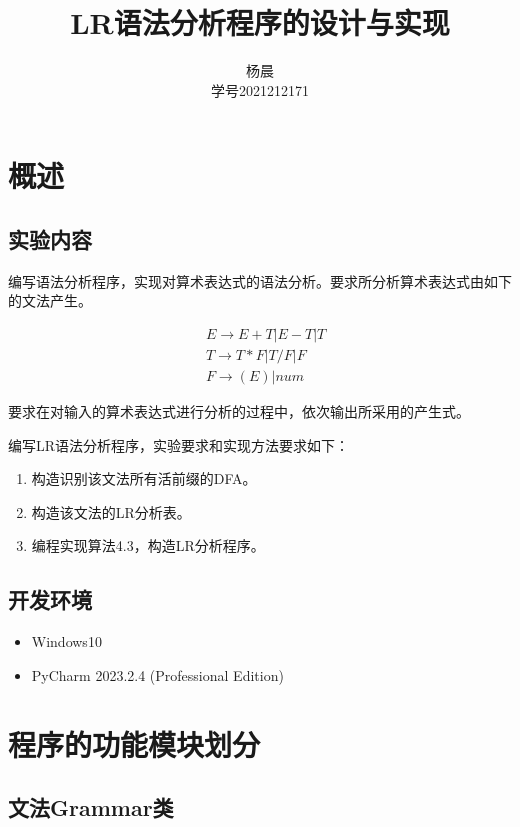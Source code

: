 \documentclass[lang=cn,11pt,a4paper]{elegantpaper}
\title{LR语法分析程序的设计与实现}
\author{杨晨 \\学号2021212171}
\institute{北京邮电大学 计算机学院}
\date{\zhtoday}
\begin{document}
\maketitle

\section{概述}

\subsection{实验内容}

编写语法分析程序，实现对算术表达式的语法分析。要求所分析算术表达式由如下的文法产生。

\label{grammar}
$$
\begin{aligned}
& E\rightarrow E+T | E-T | T \\
& T\rightarrow T*F | T/F | F \\
& F\rightarrow (E) | num
\end{aligned}
$$

要求在对输入的算术表达式进行分析的过程中，依次输出所采用的产生式。

编写LR语法分析程序，实验要求和实现方法要求如下：

\begin{enumerate}
    \item 构造识别该文法所有活前缀的DFA。
    \item 构造该文法的LR分析表。
    \item 编程实现算法4.3，构造LR分析程序。
\end{enumerate}

    
\subsection{开发环境}

\begin{itemize}
    \item Windows10
    \item PyCharm 2023.2.4 (Professional Edition)
\end{itemize}

\section{程序的功能模块划分}

\subsection{文法Grammar类}
\end{document}
